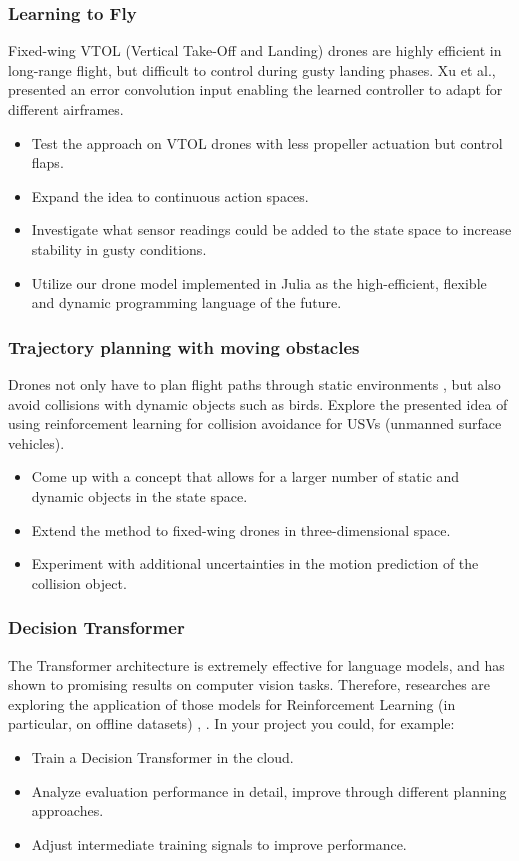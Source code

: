 \documentclass[a4paper]{article}
\begin{document}
\subsubsection{Learning to Fly}
Fixed-wing VTOL (Vertical Take-Off and Landing) drones are highly efficient in long-range flight, but difficult to control during gusty landing phases. Xu et al., \cite{LearningToFly} presented an error convolution input enabling the learned controller to adapt for different airframes.
\begin{itemize}
  \item Test the approach on VTOL drones with less propeller actuation but control flaps. 
  \item Expand the idea to continuous action spaces.
  \item Investigate what sensor readings could be added to the state space to increase stability in gusty conditions.
  \item Utilize our drone model \cite{BionicVTOL} implemented in Julia as the high-efficient, flexible and dynamic programming language of the future. 
\end{itemize}

\subsubsection{Trajectory planning with moving obstacles}
Drones not only have to plan flight paths through static environments \cite{UavTargetTracking, AutonomousNavigationUavComplexEnvironments}, but also avoid collisions with dynamic objects such as birds. Explore the presented idea \cite{usvCollisionAvoidance} of using reinforcement learning for collision avoidance for USVs (unmanned surface vehicles).
\begin{itemize}
  \item Come up with a concept that allows for a larger number of static and dynamic objects in the state space.
  \item Extend the method to fixed-wing drones in three-dimensional space.
  \item Experiment with additional uncertainties in the motion prediction of the collision object.
\end{itemize}


\subsubsection{Decision Transformer}
The Transformer architecture is extremely effective for language models, and has shown to promising results on computer vision tasks.
Therefore, researches are exploring the application of those models for Reinforcement Learning (in particular, on offline datasets) \cite{DecisionTransformer2021}, \cite{OneBigSequence2021}. In your project you could, for example:
\begin{itemize}
  \item Train a Decision Transformer in the cloud.
  \item Analyze evaluation performance in detail, improve through different planning approaches.
  \item Adjust intermediate training signals to improve performance.
\end{itemize}
\end{document}
